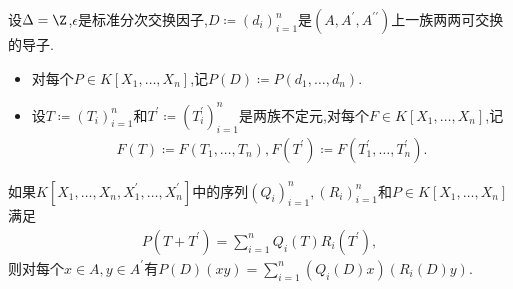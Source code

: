 \begin{proposition}{}{}
	设$\Delta=\Z$,$\epsilon$是标准分次交换因子,$D\coloneq\left(d_{i}\right)_{i=1}^{n}$是$\left(A,A^{\prime},A^{\prime\prime}\right)$上一族两两可交换的导子.
	\begin{itemize}
		\item 对每个$P\in K\left[X_{1},\ldots,X_{n}\right]$,记$P\left(D\right)\coloneq P\left(d_{1},\ldots,d_{n}\right)$.
		\item 设$T\coloneq\left(T_{i}\right)_{i=1}^{n}$和$T^{\prime}\coloneq\left(T_{i}^{\prime}\right)_{i=1}^{n}$是两族不定元,对每个$F\in K\left[X_{1},\ldots,X_{n}\right]$,记
		\begin{align*}
			F\left(T\right)\coloneq F\left(T_{1},\ldots,T_{n}\right),F\left(T^{\prime}\right)\coloneq F\left(T_{1}^{\prime},\ldots,T_{n}^{\prime}\right).
		\end{align*}
	\end{itemize}
	如果$K\left[X_{1},\ldots,X_{n},X_{1}^{\prime},\ldots,X_{n}^{\prime}\right]$中的序列$\left(Q_{i}\right)_{i=1}^{n},\left(R_{i}\right)_{i=1}^{n}$和$P\in K\left[X_{1},\ldots,X_{n}\right]$满足
	\begin{align*}
		P\left(T+T^{\prime}\right)=\sum\limits_{i=1}^{n}Q_{i}\left(T\right)R_{i}\left(T^{\prime}\right),
	\end{align*}
	则对每个$x\in A,y\in A^{\prime}$有$P\left(D\right)\left(xy\right)=\sum\limits_{i=1}^{n}\left(Q_{i}\left(D\right)x\right)\left(R_{i}\left(D\right)y\right)$.
\end{proposition}

